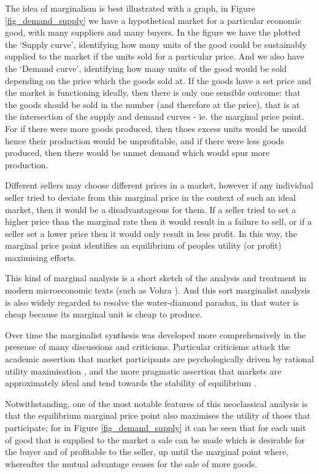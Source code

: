 The idea of marginalism is best illustrated with a graph, in Figure \ref{fig_demand_supply} we have a hypothetical market for a particular economic good, with many suppliers and many buyers.
In the figure we have the plotted the `Supply curve', identifying how many units of the good could be sustainably supplied to the market if the units sold for a particular price.
And we also have the `Demand curve', identifying how many units of the good would be sold depending on the price which the goods sold at.
If the goods have a set price and the market is functioning ideally, then there is only one sensible outcome: that the goods should be sold in the number (and therefore at the price), that is at the intersection of the supply and demand curves - ie. the marginal price point.
For if there were more goods produced, then thoes excess units would be unsold hence their production would be unprofitable, and if there were less goods produced, then there would be unmet demand which would spur more production.

Different sellers may choose different prices in a market, however if any individual seller tried to deviate from this marginal price in the context of such an ideal market, then it would be a disadvantageous for them.
If a seller tried to set a higher price than the marginal rate then it would result in a failure to sell, or if a seller set a lower price then it would only result in less profit.
In this way, the marginal price point identifies an equilibrium of peoples utility (or profit) maximising efforts.

This kind of marginal analysis is a short sketch of the analysis and treatment in modern microeconomic texts (such as Vohra \cite{vohra_2020}).
And this sort marginalist analysis is also widely regarded to resolve the water-diamond paradox, in that water is cheap because its marginal unit is cheap to produce.

Over time the marginalist synthesis was developed more comprehensively in the presense of many discussions and criticisms.
Particular criticisms attack the academic assertion that market participants are psychologically driven by rational utility maximisation \cite{RePEc:ucp:jpolec:v:58:y:1950:p:307}, and the more pragmatic assertion that markets are approximately ideal and tend towards the stability of equilibrium \cite{nla.cat-vn5739105}.



Notwithstanding, one of the most notable features of this neoclassical analysis is that the equilibrium marginal price point also maximises the utility of thoes that participate; for in Figure \ref{fig_demand_supply} it can be seen that for each unit of good that is supplied to the market a sale can be made which is desirable for the buyer and of profitable to the seller, up until the marginal point where, whereafter the mutual advantage ceases for the sale of more goods.

